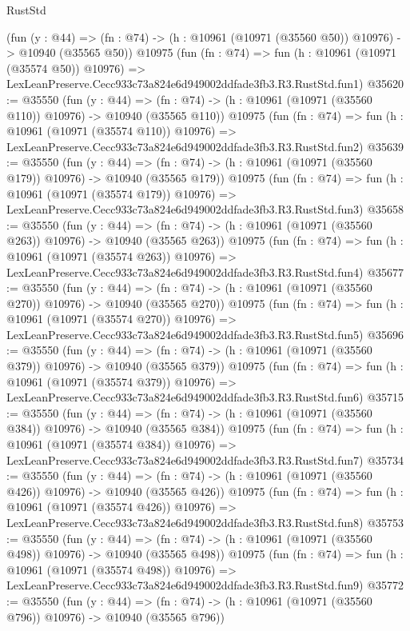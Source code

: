 \begin{lexlean}{RustStd}
\begin{coremodule}
    (fun (y : @44) =>
    (fn : @74) -> (h : @10961 (@10971 (@35560 @50)) @10976) -> @10940 (@35565 @50))
    @10975
    (fun (fn : @74) =>
    fun (h : @10961 (@10971 (@35574 @50)) @10976) =>
    LexLeanPreserve.Cecc933c73a824e6d949002ddfade3fb3.R3.RustStd.fun1)
@35620 := @35550
    (fun (y : @44) =>
    (fn : @74) -> (h : @10961 (@10971 (@35560 @110)) @10976) -> @10940 (@35565 @110))
    @10975
    (fun (fn : @74) =>
    fun (h : @10961 (@10971 (@35574 @110)) @10976) =>
    LexLeanPreserve.Cecc933c73a824e6d949002ddfade3fb3.R3.RustStd.fun2)
@35639 := @35550
    (fun (y : @44) =>
    (fn : @74) -> (h : @10961 (@10971 (@35560 @179)) @10976) -> @10940 (@35565 @179))
    @10975
    (fun (fn : @74) =>
    fun (h : @10961 (@10971 (@35574 @179)) @10976) =>
    LexLeanPreserve.Cecc933c73a824e6d949002ddfade3fb3.R3.RustStd.fun3)
@35658 := @35550
    (fun (y : @44) =>
    (fn : @74) -> (h : @10961 (@10971 (@35560 @263)) @10976) -> @10940 (@35565 @263))
    @10975
    (fun (fn : @74) =>
    fun (h : @10961 (@10971 (@35574 @263)) @10976) =>
    LexLeanPreserve.Cecc933c73a824e6d949002ddfade3fb3.R3.RustStd.fun4)
@35677 := @35550
    (fun (y : @44) =>
    (fn : @74) -> (h : @10961 (@10971 (@35560 @270)) @10976) -> @10940 (@35565 @270))
    @10975
    (fun (fn : @74) =>
    fun (h : @10961 (@10971 (@35574 @270)) @10976) =>
    LexLeanPreserve.Cecc933c73a824e6d949002ddfade3fb3.R3.RustStd.fun5)
@35696 := @35550
    (fun (y : @44) =>
    (fn : @74) -> (h : @10961 (@10971 (@35560 @379)) @10976) -> @10940 (@35565 @379))
    @10975
    (fun (fn : @74) =>
    fun (h : @10961 (@10971 (@35574 @379)) @10976) =>
    LexLeanPreserve.Cecc933c73a824e6d949002ddfade3fb3.R3.RustStd.fun6)
@35715 := @35550
    (fun (y : @44) =>
    (fn : @74) -> (h : @10961 (@10971 (@35560 @384)) @10976) -> @10940 (@35565 @384))
    @10975
    (fun (fn : @74) =>
    fun (h : @10961 (@10971 (@35574 @384)) @10976) =>
    LexLeanPreserve.Cecc933c73a824e6d949002ddfade3fb3.R3.RustStd.fun7)
@35734 := @35550
    (fun (y : @44) =>
    (fn : @74) -> (h : @10961 (@10971 (@35560 @426)) @10976) -> @10940 (@35565 @426))
    @10975
    (fun (fn : @74) =>
    fun (h : @10961 (@10971 (@35574 @426)) @10976) =>
    LexLeanPreserve.Cecc933c73a824e6d949002ddfade3fb3.R3.RustStd.fun8)
@35753 := @35550
    (fun (y : @44) =>
    (fn : @74) -> (h : @10961 (@10971 (@35560 @498)) @10976) -> @10940 (@35565 @498))
    @10975
    (fun (fn : @74) =>
    fun (h : @10961 (@10971 (@35574 @498)) @10976) =>
    LexLeanPreserve.Cecc933c73a824e6d949002ddfade3fb3.R3.RustStd.fun9)
@35772 := @35550
    (fun (y : @44) =>
    (fn : @74) -> (h : @10961 (@10971 (@35560 @796)) @10976) -> @10940 (@35565 @796))

\end{coremodule}
\end{lexlean}
